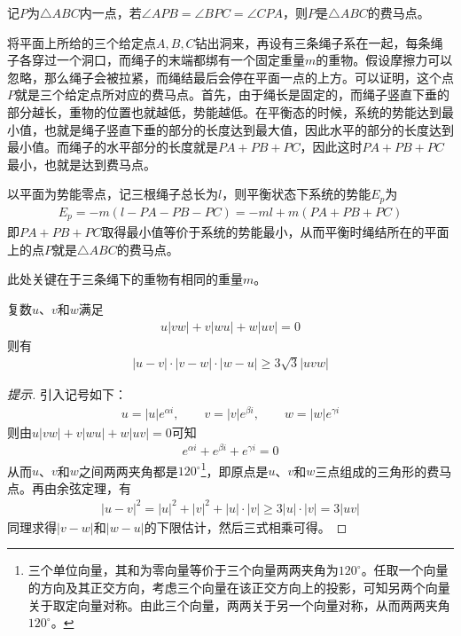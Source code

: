 \begin{theorem}
  记$P$为$\triangle ABC$内一点，若$\angle APB=\angle BPC=\angle CPA$，则$P$是$\triangle ABC$的费马点。
\end{theorem}

\begin{example}[费马点的物理学解释]\label{ex:physics-of-fermat-point}
  将平面上所给的三个给定点$A,B,C$钻出洞来，再设有三条绳子系在一起，每条绳子各穿过一个洞口，而绳子的末端都绑有一个固定重量$m$的重物。假设摩擦力可以忽略，那么绳子会被拉紧，而绳结最后会停在平面一点的上方。可以证明，这个点$P$就是三个给定点所对应的费马点。首先，由于绳长是固定的，而绳子竖直下垂的部分越长，重物的位置也就越低，势能越低。在平衡态的时候，系统的势能达到最小值，也就是绳子竖直下垂的部分的长度达到最大值，因此水平的部分的长度达到最小值。而绳子的水平部分的长度就是$PA + PB + PC$，因此这时$PA + PB + PC$最小，也就是达到费马点。

  以平面为势能零点，记三根绳子总长为$l$，则平衡状态下系统的势能$E_p$为
  \begin{align*}
    E_p=-m(l-PA-PB-PC)=-ml+m(PA+PB+PC)
  \end{align*}
  即$PA+PB+PC$取得最小值等价于系统的势能最小，从而平衡时绳结所在的平面上的点$P$就是$\triangle ABC$的费马点。

  此处关键在于三条绳下的重物有相同的重量$m$。%
\end{example}

\begin{example}
  复数$u$、$v$和$w$满足
  \begin{align*}
    u|vw| + v|wu| + w|uv| = 0
  \end{align*}
  则有
  \begin{align*}
    |u-v|\cdot |v-w|\cdot |w-u| \ge 3\sqrt3 |uvw|
  \end{align*}
\end{example}
\begin{proof}[提示]
  引入记号如下：
  \begin{align*}
    u=|u|e^{\alpha i},\qquad
    v=|v|e^{\beta i},\qquad
    w=|w|e^{\gamma i}
  \end{align*}
  则由$u|vw| + v|wu| + w|uv| = 0$可知
  \begin{align*}
    e^{\alpha i} + e^{\beta i} + e^{\gamma i} = 0
  \end{align*}
  从而$u$、$v$和$w$之间两两夹角都是$120^\circ$\footnote{三个单位向量，其和为零向量等价于三个向量两两夹角为$120^\circ$。任取一个向量的方向及其正交方向，考虑三个向量在该正交方向上的投影，可知另两个向量关于取定向量对称。由此三个向量，两两关于另一个向量对称，从而两两夹角$120^\circ$。}，即原点是$u$、$v$和$w$三点组成的三角形的费马点。再由余弦定理，有
  \begin{align*}
    |u-v|^2=|u|^2 + |v|^2 + |u|\cdot |v| \ge 3|u|\cdot |v| = 3|uv|
  \end{align*}
  同理求得$|v-w|$和$|w-u|$的下限估计，然后三式相乘可得。
\end{proof}

